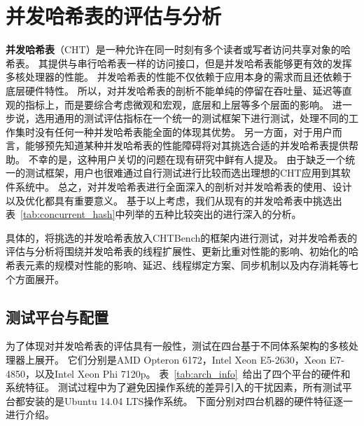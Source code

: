 \section{并发哈希表的评估与分析}
\textbf{并发哈希表}（CHT）是一种允许在同一时刻有多个读者或写者访问共享对象的哈希表。
其提供与串行哈希表一样的访问接口，但是并发哈希表能够更有效的发挥多核处理器的性能。
并发哈希表的性能不仅依赖于应用本身的需求而且还依赖于底层硬件特性。
所以，对并发哈希表的剖析不能单纯的停留在吞吐量、延迟等直观的指标上，而是要综合考虑微观和宏观，底层和上层等多个层面的影响。
进一步说，选用通用的测试评估指标在一个统一的测试框架下进行测试，处理不同的工作集时没有任何一种并发哈希表能全面的体现其优势。
另一方面，对于用户而言，能够预先知道某种并发哈希表的性能障碍将对其挑选合适的并发哈希表提供帮助。
不幸的是，这种用户关切的问题在现有研究中鲜有人提及。
由于缺乏一个统一的测试框架，用户也很难通过自行测试进行比较而选出理想的CHT应用到其软件系统中。
总之，对并发哈希表进行全面深入的剖析对并发哈希表的使用、设计以及优化都具有重要意义。
基于以上考虑，我们从现有的并发哈希表中挑选出表~\ref{tab:concurrent_hash}中列举的五种比较突出的进行深入的分析。

具体的，将挑选的并发哈希表放入CHTBench的框架内进行测试，对并发哈希表的评估与分析将围绕并发哈希表的线程扩展性、更新比重对性能的影响、初始化的哈希表元素的规模对性能的影响、延迟、线程绑定方案、同步机制以及内存消耗等七个方面展开。

\subsection{测试平台与配置}
为了体现对并发哈希表的评估具有一般性，测试在四台基于不同体系架构的多核处理器上展开。
它们分别是AMD Opteron 6172，Intel Xeon E5-2630，Xeon E7-4850，以及Intel Xeon Phi 7120p。
表~\ref{tab:arch_info}~给出了四个平台的硬件和系统特征。
测试过程中为了避免因操作系统的差异引入的干扰因素，所有测试平台都安装的是Ubuntu 14.04 LTS操作系统。
下面分别对四台机器的硬件特征逐一进行介绍。

